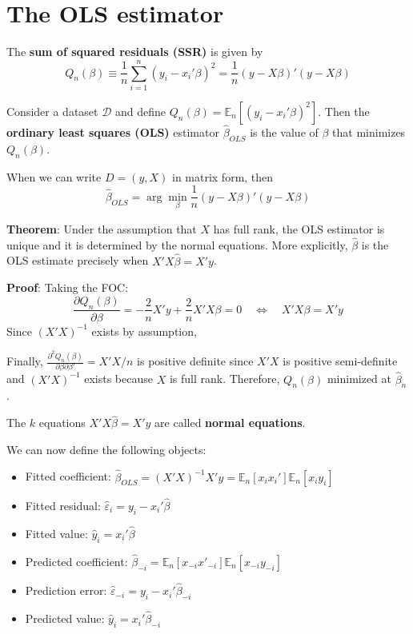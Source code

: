 \documentclass[12pt,]{book}
\providecommand{\tightlist}{%
  \setlength{\itemsep}{0pt}\setlength{\parskip}{0pt}}
\begin{document}
\hypertarget{the-ols-estimator}{%
\section{The OLS estimator}\label{the-ols-estimator}}

The \textbf{sum of squared residuals (SSR)} is given by
\[
    Q_n (\beta) \equiv   \frac{1}{n} \sum _ {i=1}^n \left( y_i - x_i'\beta \right)^2 = \frac{1}{n} (y - X\beta)' (y - X \beta)
\]

Consider a dataset \(\mathcal{D}\) and define \(Q_n(\beta) = \mathbb E_n[(y_i - x_i'\beta )^2 ]\). Then the \textbf{ordinary least squares (OLS)} estimator \(\hat \beta _ {OLS}\) is the value of \(\beta\) that minimizes \(Q_n(\beta)\).

When we can write \(D = (y, X)\) in matrix form, then
\[
  \hat \beta _ {OLS} = \arg \min_\beta \frac{1}{n} (y - X \beta)' (y - X\beta)
\]

\textbf{Theorem}:
Under the assumption that \(X\) has full rank, the OLS estimator is unique and it is determined by the normal equations. More explicitly, \(\hat \beta\) is the OLS estimate precisely when \(X'X \hat \beta = X'y\).

\textbf{Proof}:
Taking the FOC:
\[
    \frac{\partial Q_n (\beta)}{\partial \beta} = -\frac{2}{n} X' y  + \frac{2}{n} X'X\beta = 0 \quad \Leftrightarrow \quad X'X \beta = X'y
\]
Since \((X'X)^{-1}\) exists by assumption,

Finally, \(\frac{\partial^2 Q_n (\beta)}{\partial \beta \partial \beta'} = X'X/n\) is positive definite since \(X'X\) is positive semi-definite and \((X'X)^{-1}\) exists because \(X\) is full rank. Therefore, \(Q_n(\beta)\) minimized at \(\hat \beta_n\).
\[\tag*{$\blacksquare$}\]

The \(k\) equations \(X'X \hat \beta = X'y\) are called \textbf{normal equations}.

We can now define the following objects:

\begin{itemize}
\tightlist
\item
  Fitted coefficient: \(\hat \beta _ {OLS} = (X'X)^{-1} X'y = \mathbb E_n [x_i x_i'] \mathbb E_n [x_i y_i]\)
\item
  Fitted residual: \(\hat \varepsilon_i = y_i - x_i'\hat \beta\)
\item
  Fitted value: \(\hat y_i = x_i' \hat \beta\)
\item
  Predicted coefficient: \(\hat \beta _ {-i} = \mathbb E_n [x _ {-i} x' _ {-i}] \mathbb E_n [x _ {-i} y _ {-i}]\)
\item
  Prediction error: \(\hat \varepsilon _ {-i} = y_i - x_i'\hat \beta _ {-i}\)
\item
  Predicted value: \(\hat y_i = x_i' \hat \beta _ {-i}\)
\end{itemize}
\end{document}
